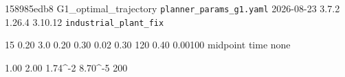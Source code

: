 %
%
%
%

\providecommand{\resdef}[2]{\expandafter\def\csname #1\endcsname{#2}}

\providecommand{\restabdir}{tab}
\providecommand{\restab}[1]{}

\resdef{resCommit}{158985edb8} %
\resdef{resBranch}{G1\_optimal\_trajectory} %
\resdef{resProfile}{\texttt{planner\_params\_g1.yaml}} %
\resdef{resDate}{2026-08-23} %
\resdef{resCasadi}{3.7.2}
\resdef{resNumpy}{1.26.4}
\resdef{resPython}{3.10.12}
\resdef{resBag}{\texttt{industrial\_plant\_fix}} %

\resdef{resN}{15}              %
\resdef{resDt}{0.20}           %
\resdef{resHorizonSeconds}{3.0} %
\resdef{resVref}{0.20}         %
\resdef{resVxMax}{0.30}
\resdef{resVyMax}{0.02}
\resdef{resOmegaMax}{0.30}
\resdef{resWobsDep}{120}       %
\resdef{resObsRDep}{0.40}      %
\resdef{resTauV}{0.00100}      %
\resdef{resIntegrator}{midpoint}
\resdef{resPathMode}{time}
\resdef{resTerminalMode}{none}

\resdef{resOrderEuler}{1.00}   %
\resdef{resOrderMidpoint}{2.00} %
\resdef{resErrEulerDep}{1.74^{-2}} %
\resdef{resErrMidpointDep}{8.70\times 10^{-5}}
\resdef{resIntegratorGain}{200} %

